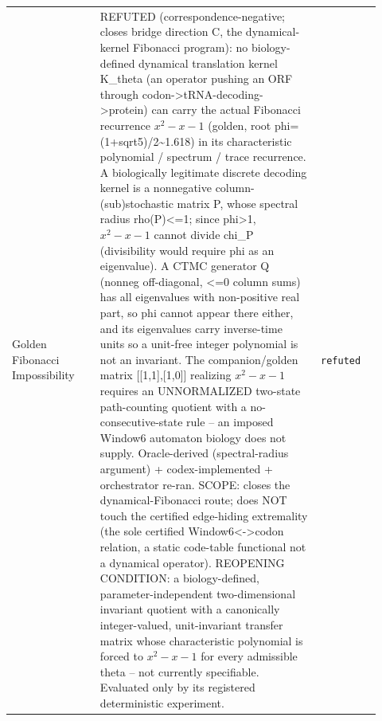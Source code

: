 \begin{longtable}{>{\raggedright\arraybackslash}p{0.22\linewidth}>{\raggedright\arraybackslash}p{0.55\linewidth}>{\raggedright\arraybackslash}p{0.15\linewidth}}
Golden Fibonacci Impossibility & REFUTED (correspondence-negative; closes bridge direction C, the dynamical-kernel Fibonacci program): no biology-defined dynamical translation kernel K\_theta (an operator pushing an ORF through codon->tRNA-decoding->protein) can carry the actual Fibonacci recurrence $x^2-x-1$ (golden, root phi=(1+sqrt5)/2\textasciitilde{}1.618) in its characteristic polynomial / spectrum / trace recurrence. A biologically legitimate discrete decoding kernel is a nonnegative column-(sub)stochastic matrix P, whose spectral radius rho(P)<=1; since phi>1, $x^2-x-1$ cannot divide chi\_P (divisibility would require phi as an eigenvalue). A CTMC generator Q (nonneg off-diagonal, <=0 column sums) has all eigenvalues with non-positive real part, so phi cannot appear there either, and its eigenvalues carry inverse-time units so a unit-free integer polynomial is not an invariant. The companion/golden matrix [[1,1],[1,0]] realizing $x^2-x-1$ requires an UNNORMALIZED two-state path-counting quotient with a no-consecutive-state rule -- an imposed Window6 automaton biology does not supply. Oracle-derived (spectral-radius argument) + codex-implemented + orchestrator re-ran. SCOPE: closes the dynamical-Fibonacci route; does NOT touch the certified edge-hiding extremality (the sole certified Window6<->codon relation, a static code-table functional not a dynamical operator). REOPENING CONDITION: a biology-defined, parameter-independent two-dimensional invariant quotient with a canonically integer-valued, unit-invariant transfer matrix whose characteristic polynomial is forced to $x^2-x-1$ for every admissible theta -- not currently specifiable. Evaluated only by its registered deterministic experiment. & \texttt{refuted} \\

\end{longtable}
